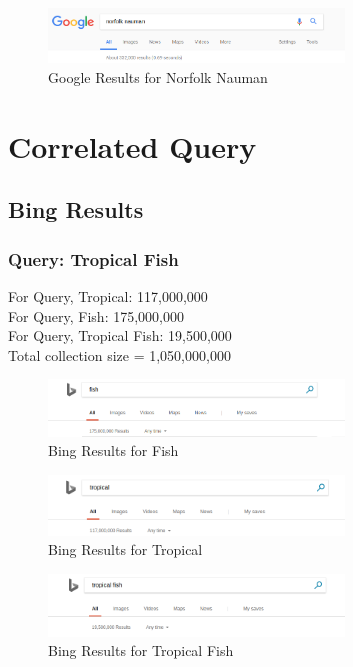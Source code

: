 \documentclass[12pt]{report}
\begin{document}
\begin{figure}[ht] 
  \centering
  \includegraphics[width=0.7\textwidth]{Google_norfolknauman.png}
  \caption{Google Results for Norfolk Nauman}
  \label{fig:12}
\end{figure}

\section{Correlated Query}
\subsection{Bing Results}
\subsubsection{Query: Tropical Fish}
For Query, Tropical: 117,000,000\\
For Query, Fish: 175,000,000\\
For Query, Tropical Fish: 19,500,000\\

Total collection size = 1,050,000,000\\

\begin{figure}[ht] 
  \centering
  \includegraphics[width=0.7\textwidth]{Bing_Fish.png}
  \caption{Bing Results for Fish}
  \label{fig:13}
\end{figure}

\begin{figure}[ht] 
  \centering
  \includegraphics[width=0.7\textwidth]{Bing_tropical.png}
  \caption{Bing Results for Tropical}
  \label{fig:14}
\end{figure}

\begin{figure}[ht] 
  \centering
  \includegraphics[width=0.7\textwidth]{Bing_tropicalfish.png}
  \caption{Bing Results for Tropical Fish}
  \label{fig:15}
\end{figure}
\end{document}
